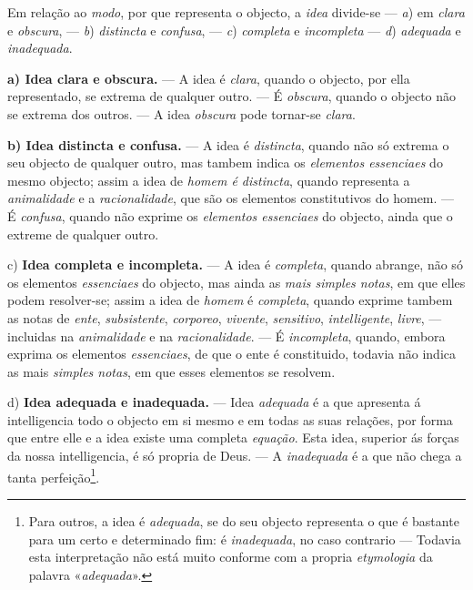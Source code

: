 
    
Em relação ao \emph{modo}, por que representa o objecto, a \emph{idea} divide-se --- \emph{a}) em \emph{clara} e \emph{obscura}, --- \emph{b}) \emph{distincta} e \emph{confusa}, --- \emph{c}) \emph{completa} e \emph{incompleta} --- \emph{d}) \emph{adequada} e \emph{inadequada}.

\textbf{a) Idea clara e obscura.} --- A idea é \emph{clara}, quando o objecto, por ella representado, se extrema de qualquer outro. --- É \emph{obscura}, quando o objecto não se extrema dos outros. --- A idea \emph{obscura} pode tornar-se \emph{clara}.

\textbf{b) Idea distincta e confusa.} --- A idea é \emph{distincta}, quando não só extrema o seu objecto de qualquer outro, mas tambem indica os \emph{elementos essenciaes} do mesmo objecto; assim a idea de \emph{homem é distincta}, quando representa a \emph{animalidade} e a \emph{racionalidade}, que são os elementos constitutivos do homem. --- É \emph{confusa}, quando não exprime os \emph{elementos essenciaes} do objecto, ainda que o extreme de qualquer outro.

c) \textbf{Idea completa e incompleta.} --- A idea é \emph{completa}, quando abrange, não só os elementos \emph{essenciaes} do objecto, mas ainda as \emph{mais simples notas}, em que elles podem resolver-se; assim a idea de \emph{homem} é \emph{completa}, quando exprime tambem as notas de \emph{ente}, \emph{subsistente}, \emph{corporeo}, \emph{vivente}, \emph{sensitivo}, \emph{intelligente}, \emph{livre}, --- incluidas na \emph{animalidade} e na \emph{racionalidade}. --- É \emph{incompleta}, quando, embora exprima os elementos \emph{essenciaes}, de que o ente é constituido, todavia não indica as mais \emph{simples notas}, em que esses elementos se resolvem.

d) \textbf{Idea adequada e inadequada.} --- Idea \emph{adequada} é a que apresenta á intelligencia todo o objecto em si mesmo e em todas as suas relações, por forma que entre elle e a idea existe uma completa \emph{equação}. Esta idea, superior ás forças da nossa intelligencia, é só propria de Deus. --- A \emph{inadequada} é a que não chega a tanta perfeição\footnote{Para outros, a idea é \emph{adequada}, se do seu objecto representa o que é bastante para um certo e determinado fim: é \emph{inadequada}, no caso contrario --- Todavia esta interpretação não está muito conforme com a propria \emph{etymologia} da palavra «\emph{adequada}».}.

